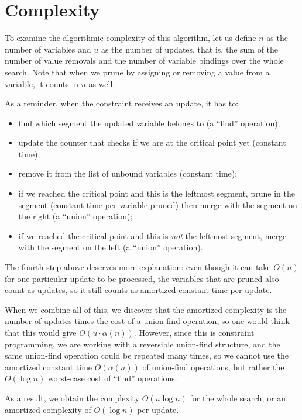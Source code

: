\documentclass[a4paper,10pt]{article}
\begin{document}
\section{Complexity}

To examine the algorithmic complexity of this algorithm, let us define $n$ as the number of variables and $u$ as the number of updates, that is, the sum of the number of value removals and the number of variable bindings over the whole search. Note that when we prune by assigning or removing a value from a variable, it counts in $u$ as well.

As a reminder, when the constraint receives an update, it has to:
\begin{itemize}
    \item find which segment the updated variable belongs to (a ``find'' operation);
    \item update the counter that checks if we are at the critical point yet (constant time);
    \item remove it from the list of unbound variables (constant time);
    \item if we reached the critical point and this is the leftmost segment, prune in the segment (constant time per variable pruned) then merge with the segment on the right (a ``union'' operation);
    \item if we reached the critical point and this is \emph{not} the leftmost segment, merge with the segment on the left (a ``union'' operation).
\end{itemize}

The fourth step above deserves more explanation: even though it can take $O(n)$ for one particular update to be processed, the variables that are pruned also count as updates, so it still counts as amortized constant time per update.

When we combine all of this, we discover that the amortized complexity is the number of updates times the cost of a union-find operation, so one would think that this would give $O(u\cdot\alpha(n))$. However, since this is constraint programming, we are working with a reversible union-find structure, and the same union-find operation could be repeated many times, so we cannot use the amortized constant time $O(\alpha(n))$ of union-find operations, but rather the $O(\log n)$ worst-case cost of ``find'' operations.

As a result, we obtain the complexity $O(u \log n)$ for the whole search, or an amortized complexity of $O(\log n)$ per update.
\end{document}
